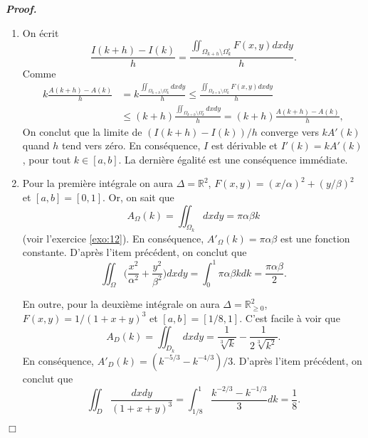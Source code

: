 \documentclass[11pt,a4paper]{article}
\newcommand{\RR}{\mathbb{R}}
\newenvironment{preuve}[1][]
{\vskip 2mm  \noindent\emph{\bf Proof#1. }}{$\Box$ \vskip 2mm}
\let\geq\geqslant
\let\leq\leqslant
\newcounter{exercice}
\begin{document}
		\begin{preuve}
			\begin{enumerate}
				\item 
				On écrit 
				\[     \frac{I(k+h) - I(k)}{h} = \frac{\iint_{\Omega_{k+h} \setminus \Omega_{k}^{\circ}} F(x,y) dx dy}{h}.     \]
				Comme  
				\begin{align*}
				k \frac{A(k+h) - A(k)}{h} &= k \frac{\iint_{\Omega_{k+h} \setminus \Omega_{k}^{\circ}} dx dy}{h} \leq \frac{\iint_{\Omega_{k+h} \setminus \Omega_{k}^{\circ}} F(x,y) dx dy}{h} 
				\\
				&\leq (k+h) \frac{\iint_{\Omega_{k+h} \setminus \Omega_{k}^{\circ}} dx dy}{h} = (k+h)  \frac{A(k+h) - A(k)}{h},
				\end{align*}          
				On conclut que la limite de $(I(k+h) - I(k))/h$ converge vers $k A'(k)$ quand $h$ tend vers zéro. 
				En conséquence, $I$ est dérivable et $I'(k) = k A'(k)$, pour tout $k \in [a,b]$. 
				La dernière égalité est une conséquence immédiate. 
				
				\item Pour la première intégrale on aura $\Delta = \RR^{2}$, $F(x,y) = (x/\alpha)^2+(y/\beta)^2$ et $[a,b] = [0,1]$. 
				Or, on sait que 
				\[     A_{\Omega}(k)=\iint_{\Omega_k}dxdy = \pi \alpha \beta k     \]
				(voir l'exercice \ref{exo:12}). 
				En conséquence, $A'_{\Omega}(k) = \pi \alpha \beta$ est une fonction constante. 
				D'après l'item précédent, on conclut que 
				\[     \iint_\Omega \bigg( \frac{x^2}{\alpha^2}+\frac{y^2}{\beta^2}\bigg) dxdy = \int_0^1 \pi \alpha \beta k dk= \frac{\pi \alpha \beta}{2}.     \]
				
				En outre, pour la deuxième intégrale on aura $\Delta = \RR^{2}_{\geq 0}$, $F(x,y) = 1/(1+x+y)^3$ et $[a,b] = [1/8,1]$. 
				C'est facile à voir que 
				\[     A_{D}(k)=\iint_{D_k}dxdy = \frac{1}{\sqrt[3]{k}} - \frac{1}{2\sqrt[3]{k^{2}}}.     \]
				En conséquence, $A'_{D}(k) = (k^{-5/3} - k^{-4/3})/3$. 
				D'après l'item précédent, on conclut que 
				\[     \iint_D \frac{dxdy}{(1+x+y)^3} = \int_{1/8}^{1} \frac{k^{-2/3} - k^{-1/3}}{3} dk= \frac{1}{8}.     \]
			\end{enumerate}
		\end{preuve}
		
\end{document}
